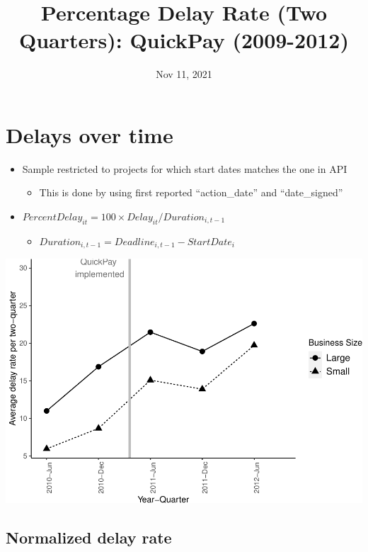 \documentclass[
]{article}
\title{Percentage Delay Rate (Two Quarters): QuickPay (2009-2012)}
\author{}
\date{\vspace{-2.5em}Nov 11, 2021}
\providecommand{\tightlist}{%
  \setlength{\itemsep}{0pt}\setlength{\parskip}{0pt}}
\begin{document}
\maketitle

\hypertarget{delays-over-time}{%
\section{Delays over time}\label{delays-over-time}}

\begin{itemize}
\tightlist
\item
  Sample restricted to projects for which start dates matches the one in
  API

  \begin{itemize}
  \tightlist
  \item
    This is done by using first reported ``action\_date'' and
    ``date\_signed''
  \end{itemize}
\item
  \(PercentDelay_{it}=100 \times Delay_{it}/Duration_{i,t-1}\)

  \begin{itemize}
  \tightlist
  \item
    \(Duration_{i,t-1} = Deadline_{i,t-1} - StartDate_i\)
  \end{itemize}
\end{itemize}

\includegraphics{qp_first_pc_delay_two_quarters_files/figure-latex/plot_pc_delay-1.pdf}

\hypertarget{normalized-delay-rate}{%
\subsection{Normalized delay rate}\label{normalized-delay-rate}}
\end{document}
